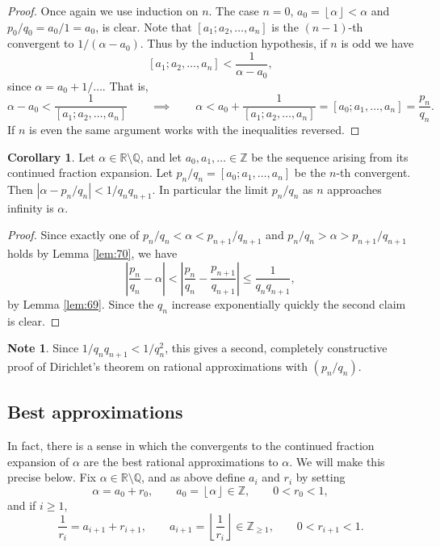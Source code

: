 \documentclass{article}
\newcommand{\Z}{\mathbb{Z}}
\newcommand{\Q}{\mathbb{Q}}
\newcommand{\R}{\mathbb{R}}
\newcommand{\rb}[1]{\left( #1 \right)}
\renewcommand{\sb}[1]{\left[ #1 \right]}
\newcommand{\abs}[1]{\left\lvert #1 \right\rvert}
\newcommand{\fb}[1]{\left\lfloor #1 \right\rfloor}
\theoremstyle{definition}\newtheorem{definition}{Definition}
\theoremstyle{definition}\newtheorem{remark}[definition]{Remark}
\theoremstyle{definition}\newtheorem*{example}{Example}
\theoremstyle{definition}\newtheorem*{note}{Note}
\newtheorem{corollary}[definition]{Corollary}
\begin{document}
\begin{proof}
Once again we use induction on $ n $. The case $ n = 0 $, $ a_0 = \fb{\alpha} < \alpha $ and $ p_0 / q_0 = a_0 / 1 = a_0 $, is clear. Note that $ \sb{a_1; a_2, \dots, a_n} $ is the $ \rb{n - 1} $-th convergent to $ 1 / \rb{\alpha - a_0} $. Thus by the induction hypothesis, if $ n $ is odd we have
$$ \sb{a_1; a_2, \dots, a_n} < \dfrac{1}{\alpha - a_0}, $$
since $ \alpha = a_0 + 1 / \dots $. That is,
$$ \alpha - a_0 < \dfrac{1}{\sb{a_1; a_2, \dots, a_n}} \qquad \implies \qquad \alpha < a_0 + \dfrac{1}{\sb{a_1; a_2, \dots, a_n}} = \sb{a_0; a_1, \dots, a_n} = \dfrac{p_n}{q_n}. $$
If $ n $ is even the same argument works with the inequalities reversed.
\end{proof}

\begin{corollary}
Let $ \alpha \in \R \setminus \Q $, and let $ a_0, a_1, \dots \in \Z $ be the sequence arising from its continued fraction expansion. Let $ p_n / q_n = \sb{a_0; a_1, \dots, a_n} $ be the $ n $-th convergent. Then $ \abs{\alpha - p_n / q_n} < 1 / q_nq_{n + 1} $. In particular the limit $ p_n / q_n $ as $ n $ approaches infinity is $ \alpha $.
\end{corollary}

\begin{proof}
Since exactly one of $ p_n / q_n < \alpha < p_{n + 1} / q_{n + 1} $ and $ p_n / q_n > \alpha > p_{n + 1} / q_{n + 1} $ holds by Lemma \ref{lem:70}, we have
$$ \abs{\dfrac{p_n}{q_n} - \alpha} < \abs{\dfrac{p_n}{q_n} - \dfrac{p_{n + 1}}{q_{n + 1}}} \le \dfrac{1}{q_nq_{n + 1}}, $$
by Lemma \ref{lem:69}. Since the $ q_n $ increase exponentially quickly the second claim is clear.
\end{proof}

\begin{note}
Since $ 1 / q_nq_{n + 1} < 1 / q_n^2 $, this gives a second, completely constructive proof of Dirichlet's theorem on rational approximations with $ \rb{p_n / q_n} $.
\end{note}

\subsection{Best approximations}

In fact, there is a sense in which the convergents to the continued fraction expansion of $ \alpha $ are the best rational approximations to $ \alpha $. We will make this precise below. Fix $ \alpha \in \R \setminus \Q $, and as above define $ a_i $ and $ r_i $ by setting
$$ \alpha = a_0 + r_0, \qquad a_0 = \fb{\alpha} \in \Z, \qquad 0 < r_0 < 1, $$
and if $ i \ge 1 $,
$$ \dfrac{1}{r_i} = a_{i + 1} + r_{i + 1}, \qquad a_{i + 1} = \fb{\dfrac{1}{r_i}} \in \Z_{\ge 1}, \qquad 0 < r_{i + 1} < 1. $$
\end{document}
